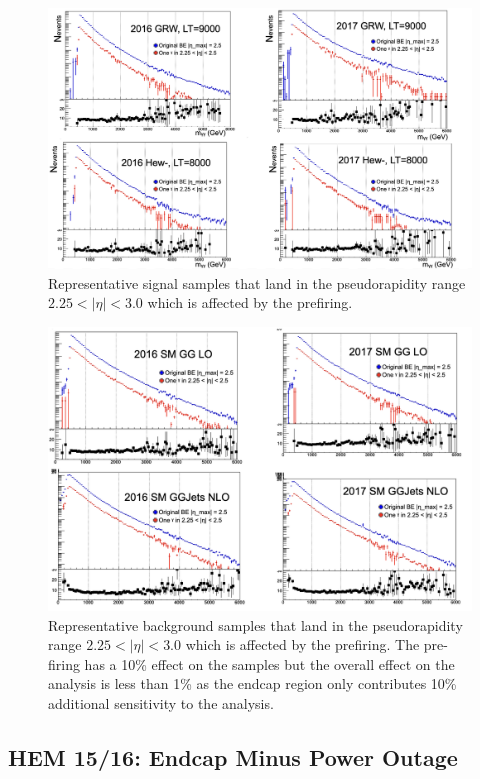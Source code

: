 \begin{figure}[!htb]
	\centering
	\includegraphics[scale=0.6]{fig/EEL1Prefiring2.png}
	\caption{Representative signal samples that land in the pseudorapidity range $2.25 < |\eta| <3.0$ which is affected by the prefiring.}
	\label{fig:EEL1Prefiringcheck2}
\end{figure}

\begin{figure}[!htb]
	\centering
	\includegraphics[scale=0.6]{fig/EEL1Prefiring1.png}
	\caption{Representative background samples that land in the pseudorapidity range $2.25 < |\eta| <3.0$ which is affected by the prefiring. The pre-firing has a 10\% effect on the samples but the overall effect on the analysis is less than 1\% as the endcap region only contributes 10\% additional sensitivity to the analysis.}
	\label{fig:EEL1Prefiringcheck1}
\end{figure}

\subsection{HEM 15/16: Endcap Minus Power Outage}

